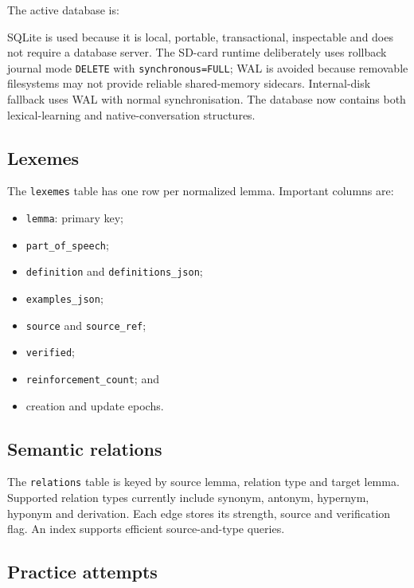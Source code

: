 \documentclass[11pt,a4paper]{article}
\begin{document}
The active database is:

\begin{quote}
\end{quote}

SQLite is used because it is local, portable, transactional, inspectable and does not require
a database server. The SD-card runtime deliberately uses rollback journal mode
\texttt{DELETE} with \texttt{synchronous=FULL}; WAL is avoided because removable filesystems
may not provide reliable shared-memory sidecars. Internal-disk fallback uses WAL with normal
synchronisation. The database now contains both lexical-learning and native-conversation
structures.

\subsection{Lexemes}

The \texttt{lexemes} table has one row per normalized lemma. Important columns are:

\begin{itemize}
  \item \texttt{lemma}: primary key;
  \item \texttt{part\_of\_speech};
  \item \texttt{definition} and \texttt{definitions\_json};
  \item \texttt{examples\_json};
  \item \texttt{source} and \texttt{source\_ref};
  \item \texttt{verified};
  \item \texttt{reinforcement\_count}; and
  \item creation and update epochs.
\end{itemize}

\subsection{Semantic relations}

The \texttt{relations} table is keyed by source lemma, relation type and target lemma. Supported
relation types currently include synonym, antonym, hypernym, hyponym and derivation. Each edge
stores its strength, source and verification flag. An index supports efficient source-and-type
queries.

\subsection{Practice attempts}
\end{document}
